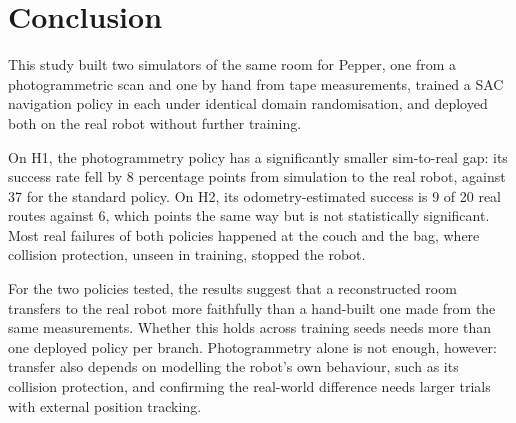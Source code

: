\section{Conclusion}\label{sec:conclusion}
This study built two simulators of the same room for Pepper, one from a photogrammetric scan and
one by hand from tape measurements, trained a SAC navigation policy in each under identical domain
randomisation, and deployed both on the real robot without further training.

On H1, the photogrammetry policy has a significantly smaller sim-to-real gap: its success rate fell
by 8 percentage points from simulation to the real robot, against 37 for
the standard policy. On H2, its odometry-estimated success is 9 of 20 real routes against 6, which
points the same way but is not statistically significant. Most real failures of both policies
happened at the couch and the bag, where collision protection, unseen in training, stopped the
robot.

For the two policies tested, the results suggest that a reconstructed room transfers to the real
robot more faithfully than a hand-built one made from the same measurements. Whether this holds
across training seeds needs more than one deployed policy per branch. Photogrammetry alone is not enough, however:
transfer also depends on modelling the robot's own behaviour, such as its collision protection,
and confirming the real-world difference needs larger trials with external position tracking.
